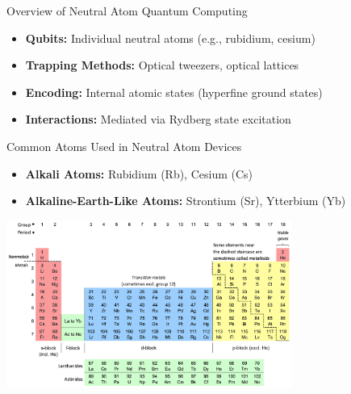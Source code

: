 \begin{frame}{Overview of Neutral Atom Quantum Computing}
    \begin{itemize}
        \item \textbf{Qubits:} Individual neutral atoms (e.g., rubidium, cesium)
        \item \textbf{Trapping Methods:} Optical tweezers, optical lattices
        \item \textbf{Encoding:} Internal atomic states (hyperfine ground states)
        \item \textbf{Interactions:} Mediated via Rydberg state excitation
    \end{itemize}
\end{frame}

\begin{frame}{Common Atoms Used in Neutral Atom Devices}
  \begin{itemize}
    \item \textbf{Alkali Atoms:} Rubidium (Rb), Cesium (Cs)
    \item \textbf{Alkaline-Earth-Like Atoms:} Strontium (Sr), Ytterbium (Yb)
  \end{itemize}
  \centering
  \includegraphics[width=0.7\textwidth]{images/Colour_18-col_PT_with_labels.png}
\end{frame}

